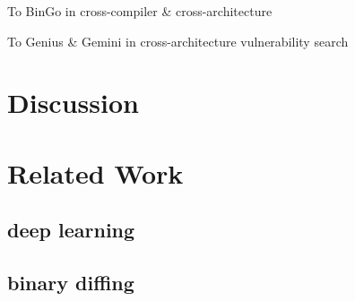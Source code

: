 \documentclass[10pt,conference]{IEEEtran}
\begin{document}
\par To BinGo in cross-compiler \& cross-architecture

\par To Genius \& Gemini in cross-architecture vulnerability search





\section{Discussion}

\section{Related Work}

\subsection{deep learning}

\subsection{binary diffing}

%
%

\end{document}
